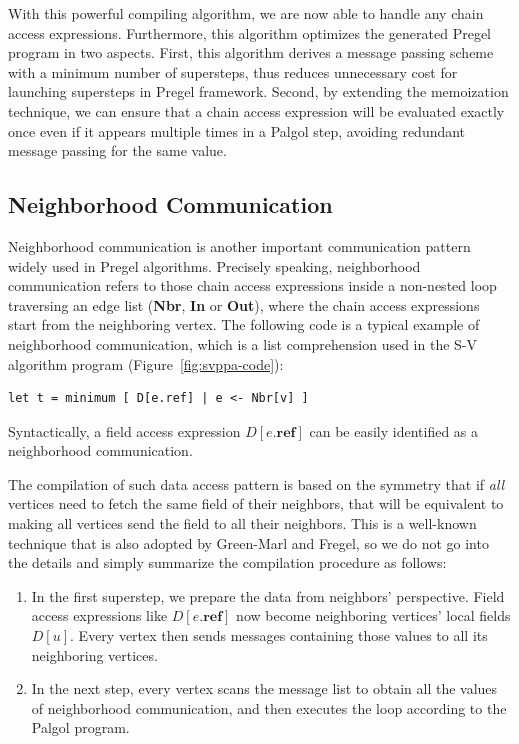 \documentclass{sokendai_thesis} %
\begin{document}
With this powerful compiling algorithm, we are now able to handle any chain access expressions.
Furthermore, this algorithm optimizes the generated Pregel program in two aspects.
First, this algorithm derives a message passing scheme with a minimum number of supersteps, thus reduces unnecessary cost for launching supersteps in Pregel framework.
Second, by extending the memoization technique, we can ensure that a chain access expression will be evaluated exactly once even if it appears multiple times in a Palgol step, avoiding redundant message passing for the same value.


\subsection{Neighborhood Communication}
\label{sec:neighboring-access}

Neighborhood communication is another important communication pattern widely used in Pregel algorithms.
Precisely speaking, neighborhood communication refers to those chain access expressions inside a non-nested loop traversing an edge list (\textbf{Nbr}, \textbf{In} or \textbf{Out}), where the chain access expressions start from the neighboring vertex.
The following code is a typical example of neighborhood communication, which is a list comprehension used in the S-V algorithm program (Figure~\ref{fig:svppa-code}):
\begin{lstlisting}[basicstyle=\footnotesize,firstnumber=7]
    let t = minimum [ D[e.ref] | e <- Nbr[v] ]
\end{lstlisting}
Syntactically, a field access expression $D[e.\mathbf{ref}]$ can be easily identified as a neighborhood communication.

The compilation of such data access pattern is based on the symmetry that if \emph{all} vertices need to fetch the same field of their neighbors, that will be equivalent to making all vertices send the field to all their neighbors.
This is a well-known technique that is also adopted by Green-Marl and Fregel, so we do not go into the details and simply summarize the compilation procedure as follows:
\begin{enumerate}
 \item In the first superstep, we prepare the data from neighbors' perspective.
  Field access expressions like $D[e.\mathbf{ref}]$ now become neighboring vertices' local fields $D[u]$.
  Every vertex then sends messages containing those values to all its neighboring vertices.
 \item In the next step, every vertex scans the message list to obtain all the values of neighborhood communication, and then executes the loop according to the Palgol program.
\end{enumerate}
\end{document}
